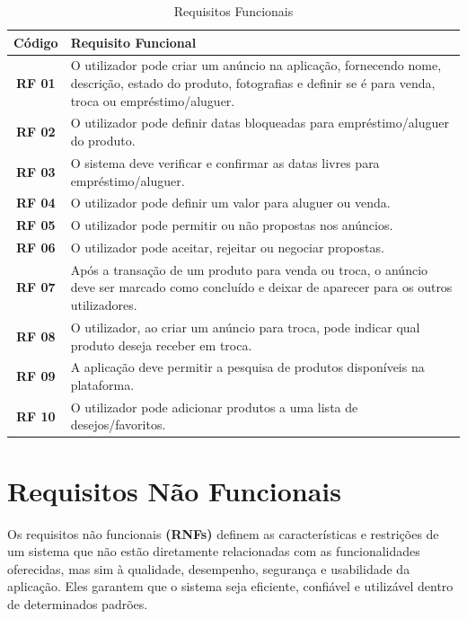 \documentclass[a4paper, 12pt]{article} %
\begin{document}
\begin{table}[H]
	\centering
	\renewcommand{\arraystretch}{1.3}
	\begin{tabular}{|c|p{12cm}|}
		\hline
		\textbf{Código} & \textbf{Requisito Funcional} \\
		\hline
		\textbf{RF 01} & O utilizador pode criar um anúncio na aplicação, fornecendo nome, descrição, estado do produto, fotografias e definir se é para venda, troca ou empréstimo/aluguer. \\
		\hline
		\textbf{RF 02} & O utilizador pode definir datas bloqueadas para empréstimo/aluguer do produto. \\
		\hline
		\textbf{RF 03} & O sistema deve verificar e confirmar as datas livres para empréstimo/aluguer. \\
		\hline
		\textbf{RF 04} & O utilizador pode definir um valor para aluguer ou venda. \\
		\hline
		\textbf{RF 05} & O utilizador pode permitir ou não propostas nos anúncios. \\
		\hline
		\textbf{RF 06} & O utilizador pode aceitar, rejeitar ou negociar propostas. \\
		\hline
		\textbf{RF 07} & Após a transação de um produto para venda ou troca, o anúncio deve ser marcado como concluído e deixar de aparecer para os outros utilizadores. \\
		\hline
		\textbf{RF 08} & O utilizador, ao criar um anúncio para troca, pode indicar qual produto deseja receber em troca. \\
		\hline
		\textbf{RF 09} & A aplicação deve permitir a pesquisa de produtos disponíveis na plataforma. \\
		\hline
		\textbf{RF 10} & O utilizador pode adicionar produtos a uma lista de desejos/favoritos. \\
		\hline
	\end{tabular}
	\caption{Requisitos Funcionais}
	\label{tab:requisitos_funcionais}
\end{table}


\newpage
\section{Requisitos Não Funcionais}

Os requisitos não funcionais \textbf{(RNFs)} definem as características e restrições de um sistema que não estão diretamente relacionadas com as funcionalidades oferecidas, mas sim à qualidade, desempenho, segurança e usabilidade da aplicação. Eles garantem que o sistema seja eficiente, confiável e utilizável dentro de determinados padrões.
\end{document}
